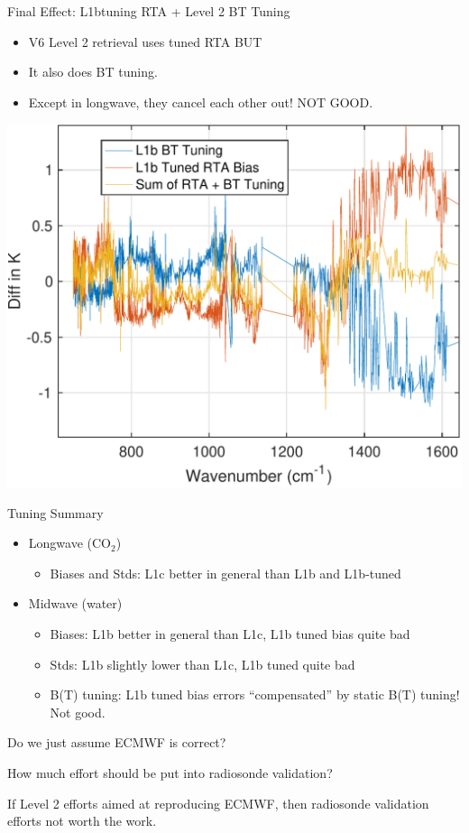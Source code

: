 \documentclass[10pt,t]{beamer}
\begin{document}
\begin{frame}[label={sec:orgcfca8da}]{Final Effect: L1btuning RTA + Level 2 BT Tuning}
\begin{itemize}
\item V6 Level 2 retrieval uses tuned RTA \alert{BUT}
\item It also does BT tuning.
\item Except in longwave, they cancel each other out!  NOT GOOD.
\end{itemize}
\begin{center}
\includegraphics[width=0.65\linewidth]{./Talk2/l1b_bttuning_l1b_tunedbias_added.pdf}
\end{center}
\end{frame}

\begin{frame}{Tuning Summary}
\begin{itemize}
\item Longwave (CO$_2$)
  \begin{itemize}
  \item Biases and Stds: L1c better in general than L1b and L1b-tuned
  \end{itemize}
\item Midwave (water)
  \begin{itemize}
  \item Biases:  L1b better in general than L1c, L1b tuned bias quite bad
  \item Stds: L1b slightly lower than L1c, L1b tuned quite bad
  \item B(T) tuning:  L1b tuned bias errors ``compensated'' by static B(T) tuning!  Not good.
  \end{itemize}
\end{itemize}

Do we just assume ECMWF is correct?

How much effort should be put into radiosonde validation?

If Level 2 efforts aimed at reproducing ECMWF, then radiosonde validation efforts not worth the work.
\end{frame}
\end{document}
